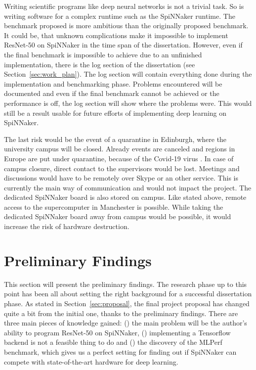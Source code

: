 \documentclass{article}
\begin{document}
Writing scientific programs like deep neural networks is
not a trivial task.
So is writing software for a complex runtime such as the
SpiNNaker runtime.
The benchmark proposed is more ambitious than the originally proposed
benchmark.
It could be, that unknown complications make it impossible to
implement ResNet-50 on SpiNNaker in the time span of the dissertation.
However, even if the final benchmark is impossible to achieve
due to an unfinished implementation, there is the log
section of the dissertation (see Section~\ref{sec:work_plan}).
The log section will contain everything done during the
implementation and benchmarking phase.
Problems encountered will be documented and even if the
final benchmark cannot be achieved or the performance is
off, the log section will show where the problems were.
This would still be a result usable for future efforts of implementing
deep learning on SpiNNaker.

The last risk would be the event of a quarantine in Edinburgh,
where the university campus will be closed.
Already events are canceled and regions in Europe are put under
quarantine, because of the Covid-19 virus
\citep{borghese_et_al_2020}.
In case of campus closure, direct contact to the supervisors would be
lost.
Meetings and discussions would have to be remotely over Skype or an
other service.
This is currently the main way of communication and would not impact
the project.
The dedicated SpiNNaker board is also stored on campus.
Like stated above, remote access to the supercomputer in Manchester
is possible.
While taking the dedicated SpiNNaker board away from campus would be
possible, it would increase the risk of hardware destruction.


\section{Preliminary Findings} %
\label{sec:prelim}

This section will present the preliminary findings.
The research phase up to this point has been all about setting the
right background for a successful dissertation phase.
As stated in Section~\ref{sec:proposal}, the final
project proposal has changed quite a bit from the initial
one, thanks to the preliminary findings.
There are three main pieces of knowledge gained:
() the main problem will be the author's ability to
program ResNet-50 on SpiNNaker,
() implementing a Tensorflow backend is not a feasible
thing to do and () the discovery of the MLPerf
benchmark, which gives us a perfect setting for finding out if
SpiNNaker can compete with state-of-the-art hardware for
deep learning.
\end{document}
